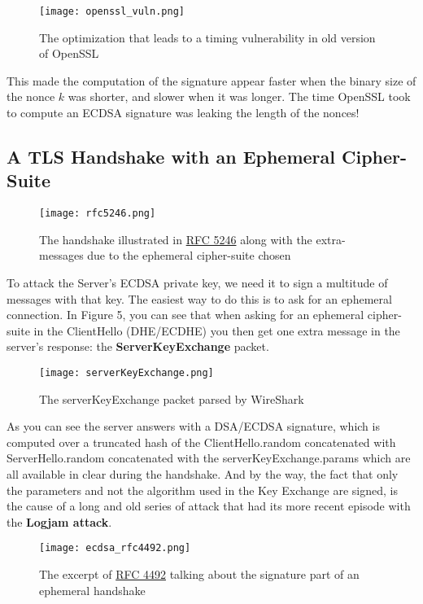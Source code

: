 \documentclass[a4paper,11pt]{article}
\begin{document}
\begin{figure}[H]
\texttt{[image: openssl\_vuln.png]}
\caption{The optimization that leads to a timing vulnerability in old version of OpenSSL}
\end{figure}

This made the computation of the signature appear faster when the binary size of the nonce $k$ was shorter, and slower when it was longer. The time OpenSSL took to compute an ECDSA signature was leaking the length of the nonces!

\subsection{A TLS Handshake with an Ephemeral Cipher-Suite}

\begin{figure}[H]
\texttt{[image: rfc5246.png]}
\caption{The handshake illustrated in \href{https://tools.ietf.org/html/rfc5246#section-7.3}{RFC 5246} along with the extra-messages due to the ephemeral cipher-suite chosen}
\end{figure}

To attack the Server's ECDSA private key, we need it to sign a multitude of messages with that key. The easiest way to do this is to ask for an ephemeral connection. In Figure 5, you can see that when asking for an ephemeral cipher-suite in the ClientHello (DHE/ECDHE) you then get one extra message in the server's response: the \textbf{ServerKeyExchange} packet.

\begin{figure}[H]
\texttt{[image: serverKeyExchange.png]}
\caption{The serverKeyExchange packet parsed by WireShark}
\end{figure}

As you can see the server answers with a DSA/ECDSA signature, which is computed over a truncated hash of the ClientHello.random concatenated with ServerHello.random concatenated with the serverKeyExchange.params which are all available in clear during the handshake. And by the way, the fact that only the parameters and not the algorithm used in the Key Exchange are signed, is the cause of a long and old series of attack that had its more recent episode with the \textbf{Logjam attack}\cite{logjam}.

\begin{figure}[H]
\texttt{[image: ecdsa\_rfc4492.png]}
\caption{The excerpt of \href{https://tools.ietf.org/html/rfc4492#section-5.4}{RFC 4492} talking about the signature part of an ephemeral handshake}
\end{figure}
\end{document}
